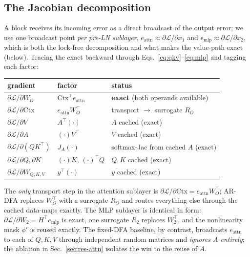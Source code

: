 \documentclass[11pt]{article}
\newcommand{\ARDFA}{\textsc{AR-DFA}}
\begin{document}
\subsection{The Jacobian decomposition}
A block receives its incoming error as a direct broadcast of the output error; we use one broadcast point \emph{per pre-LN sublayer}, $e_{\text{attn}}\!\approx\!\partial\mathcal L/\partial x_1$ and $e_{\text{mlp}}\!\approx\!\partial\mathcal L/\partial x_2$, which is both the lock-free decomposition and what makes the value-path exact (below). Tracing the exact backward through Eqs.~\eqref{eq:qkv}--\eqref{eq:mlp} and tagging each factor:
\begin{center}
\small
\begin{tabular}{@{}lll@{}}
\toprule
gradient & factor & status \\
\midrule
$\partial\mathcal L/\partial W_O$ & $\mathrm{Ctx}^\top e_{\text{attn}}$ & \textbf{exact} (both operands available) \\
$\partial\mathcal L/\partial \mathrm{Ctx}$ & $e_{\text{attn}} W_O^\top$ & transport $\to$ surrogate $R_O$ \\
$\partial\mathcal L/\partial V$ & $A^\top(\cdot)$ & $A$ cached (exact) \\
$\partial\mathcal L/\partial A$ & $(\cdot)V^\top$ & $V$ cached (exact) \\
$\partial\mathcal L/\partial (QK^\top)$ & $J_A(\cdot)$ & softmax-Jac from cached $A$ (exact) \\
$\partial\mathcal L/\partial Q,\partial K$ & $(\cdot)K,\,(\cdot)^\top Q$ & $Q,K$ cached (exact) \\
$\partial\mathcal L/\partial W_{Q,K,V}$ & $y^\top(\cdot)$ & $y$ cached (exact) \\
\bottomrule
\end{tabular}
\end{center}
The \emph{only} transport step in the attention sublayer is $\partial\mathcal L/\partial\mathrm{Ctx}=e_{\text{attn}}W_O^\top$; \ARDFA{} replaces $W_O^\top$ with a surrogate $R_O$ and routes everything else through the cached data-maps exactly. The MLP sublayer is identical in form: $\partial\mathcal L/\partial W_2=H^\top e_{\text{mlp}}$ is exact, one surrogate $R_2$ replaces $W_2^\top$, and the nonlinearity mask $\phi'$ is reused exactly. The fixed-DFA baseline, by contrast, broadcasts $e_{\text{attn}}$ to each of $Q,K,V$ through independent random matrices and \emph{ignores $A$ entirely}; the ablation in Sec.~\ref{sec:res-attn} isolates the win to the reuse of $A$.
\end{document}
